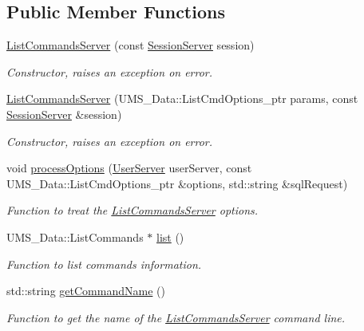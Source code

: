 \subsection*{Public Member Functions}
\begin{DoxyCompactItemize}
\item 
\hyperlink{classListCommandsServer_a026e657dcd109d5ba27db145a123f7d3}{ListCommandsServer} (const \hyperlink{classSessionServer}{SessionServer} session)
\begin{DoxyCompactList}\small\item\em Constructor, raises an exception on error. \item\end{DoxyCompactList}\item 
\hyperlink{classListCommandsServer_a78e10da7e68e9fddfee054fc39195063}{ListCommandsServer} (UMS\_\-Data::ListCmdOptions\_\-ptr params, const \hyperlink{classSessionServer}{SessionServer} \&session)
\begin{DoxyCompactList}\small\item\em Constructor, raises an exception on error. \item\end{DoxyCompactList}\item 
void \hyperlink{classListCommandsServer_a796730b81d44caa578bef2ea89362755}{processOptions} (\hyperlink{classUserServer}{UserServer} userServer, const UMS\_\-Data::ListCmdOptions\_\-ptr \&options, std::string \&sqlRequest)
\begin{DoxyCompactList}\small\item\em Function to treat the \hyperlink{classListCommandsServer}{ListCommandsServer} options. \item\end{DoxyCompactList}\item 
UMS\_\-Data::ListCommands $\ast$ \hyperlink{classListCommandsServer_ae256dad4b7cb57e73dd3dc2c5dcb3e7b}{list} ()
\begin{DoxyCompactList}\small\item\em Function to list commands information. \item\end{DoxyCompactList}\item 
std::string \hyperlink{classListCommandsServer_ae51f623d61d994481bdc0e77025b1cd3}{getCommandName} ()
\begin{DoxyCompactList}\small\item\em Function to get the name of the \hyperlink{classListCommandsServer}{ListCommandsServer} command line. \item\end{DoxyCompactList}\item 

\end{DoxyCompactItemize}
